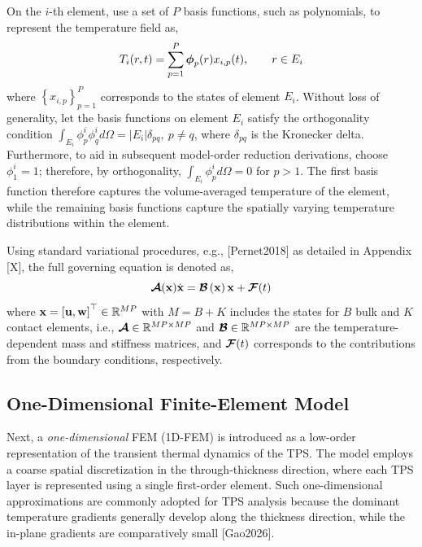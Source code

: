 On the $i$-th element, use a set of $P$ basis functions, such as polynomials, to represent the temperature field as,
\begin{equation}
    T_i(r,t) = \sum_{p=1}^P \boldsymbol{\phi}_p(r) x_{i,p}(t),\qquad r\in E_i\label{eqn_temperature_approximation}
\end{equation}
where $\left\{x_{i,p}\right\}_{p=1}^{P}$ corresponds to the states of element $E_i$. Without loss of generality, let the basis functions on element $E_i$ satisfy the orthogonality condition $\int_{E_i}\phi_p^i\phi_q^i d\Omega = \left|E_i\right|\delta_{pq},\: p\neq q$, where $\delta_{pq}$ is the Kronecker delta. Furthermore, to aid in subsequent model-order reduction derivations, choose $\phi_1^i=1$; therefore, by orthogonality, $\int_{E_i}\phi_p^i d\Omega = 0$ for $p>1$. The first basis function therefore captures the volume-averaged temperature of the element, while the remaining basis functions capture the spatially varying temperature distributions within the element.

Using standard variational procedures, e.g., [Pernet2018] as detailed in Appendix [X], the full governing equation is denoted as,
\begin{equation}
    \boldsymbol{\mathcal{A}}(\mathbf{x})\dot{\mathbf{x}} = \boldsymbol{\mathcal{B}}\left(\mathbf{x}\right)\mathbf{x} + \boldsymbol{\mathcal{F}}(t)\label{eqn_dg_fem}
\end{equation}
where $\mathbf{x}=\left[\mathbf{u},\mathbf{w}\right]^\top\in\mathbb{R}^{MP}$ with $M=B+K$ includes the states for $B$ bulk and $K$ contact elements, i.e., $\boldsymbol{\mathcal{A}}\in\mathbb{R}^{MP\times MP}$ and $\boldsymbol{\mathcal{B}}\in\mathbb{R}^{MP\times MP}$ are the temperature-dependent mass and stiffness matrices, and $\boldsymbol{\mathcal{F}}(t)$ corresponds to the contributions from the boundary conditions, respectively.

\subsection{One-Dimensional Finite-Element Model}

Next, a \emph{one-dimensional} FEM (1D-FEM) is introduced as a low-order representation of the transient thermal dynamics of the TPS. The model employs a coarse spatial discretization in the through-thickness direction, where each TPS layer is represented using a single first-order element. Such one-dimensional approximations are commonly adopted for TPS analysis because the dominant temperature gradients generally develop along the thickness direction, while the in-plane gradients are comparatively small [Gao2026]. 

